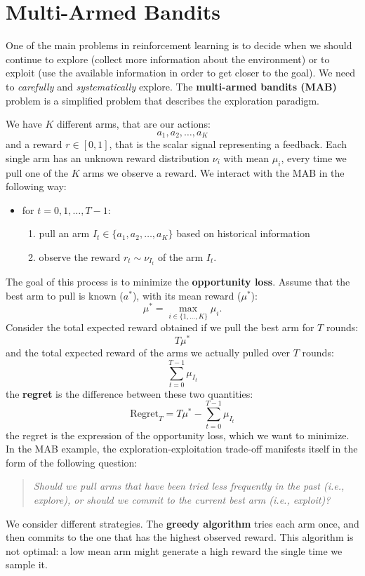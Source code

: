 \documentclass[10pt, a4paper]{report}
\begin{document}
\section{Multi-Armed Bandits}\label{bandits}
One of the main problems in reinforcement learning is to decide when we should continue to explore (collect more information about the environment) or to exploit (use the available information in order to get closer to the goal). 
We need to \textit{carefully} and \textit{systematically} explore. The \textbf{multi-armed bandits (MAB)} problem is a simplified problem that describes the exploration paradigm.\bigskip 

\noindent We have $K$ different arms, that are our actions:\begin{equation}
    a_1,a_2,\dots, a_K
\end{equation}
and a reward $r\in [0,1]$, that is the scalar signal representing a feedback. Each single arm has an unknown reward distribution $\nu_i$ with mean $\mu_i$, every time we pull one of the $K$ arms we observe a reward. We interact with the MAB in the following way:\begin{itemize}
    \item for $t=0,1,\dots,T-1$:\begin{enumerate}
        \item pull an arm $I_t\in\{a_1,a_2,\dots, a_K\}$ based on historical information 
        \item observe the reward $r_t\sim \nu_{I_t}$ of the arm $I_t$.
    \end{enumerate}
\end{itemize}
The goal of this process is to minimize the \textbf{opportunity loss}. Assume that the best arm to pull is known ($a^*$), with its mean reward ($\mu^*$):\begin{equation}
    \mu^*=\max_{i\in \{1,\dots, K\}}\mu_i.
\end{equation}
Consider the total expected reward obtained if we pull the best arm for $T$ rounds:\begin{equation}
    T\mu^*
\end{equation}
and the total expected reward of the arms we actually pulled over $T$ rounds:\begin{equation}
    \sum_{t=0}^{T-1}\mu_{I_t}
\end{equation}
the \textbf{regret} is the difference between these two quantities:\begin{equation}
    \text{Regret}_T=T\mu^*-\sum_{t=0}^{T-1}\mu_{I_t}
\end{equation}
the regret is the expression of the opportunity loss, which we want to minimize. In the MAB example, the exploration-exploitation trade-off manifests itself in the form of the following question:\begin{quotation}
    \textit{Should we pull arms that have been tried less frequently in the past (i.e., explore), or should we commit to
    the current best arm (i.e., exploit)?}
\end{quotation}
We consider different strategies. The \textbf{greedy algorithm} tries each arm once, and then commits to the one that has the highest observed reward. This algorithm is not optimal: a low mean arm might generate a high reward the single time we sample it.
\end{document}
